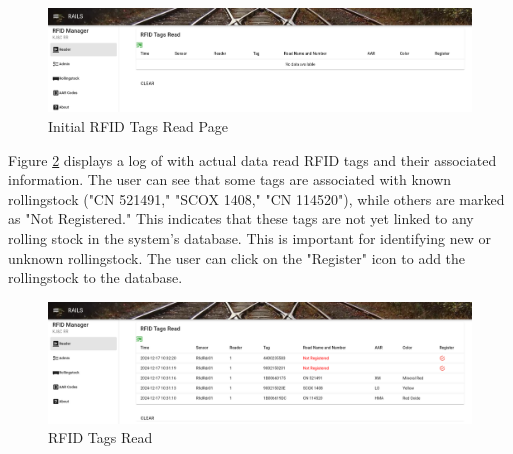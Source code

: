 \begin{figure}[H]
    \centering
    \includegraphics[scale=0.33]{./images/reader.png}
    \caption{Initial RFID Tags Read Page}
    \label{fig:reader1}
\end{figure}
Figure \ref{fig:reader2} displays a log of with actual data read RFID tags and their associated information. The user can see that 
some tags are associated with known rollingstock ("CN 521491," "SCOX 1408," "CN 114520"), while others are marked as "Not Registered." 
This indicates that these tags are not yet linked to any rolling stock in the system's database. This is important for identifying 
new or unknown rollingstock. The user can click on the "Register" icon to add the rollingstock to the database.

\begin{figure}[H]
    \centering
    \includegraphics[scale=0.33]{./images/reader1.png}
    \caption{RFID Tags Read}
    \label{fig:reader2}
\end{figure}

